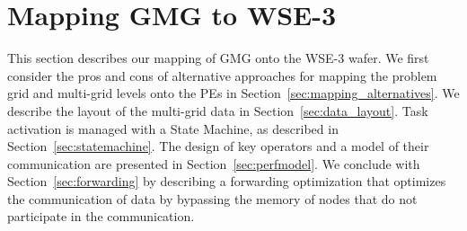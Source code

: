 \documentclass[conference]{IEEEtran}
\begin{document}

\section{Mapping GMG to WSE-3}
        This section describes our mapping of GMG onto the WSE-3 wafer.  We first consider the pros and cons of alternative approaches for mapping the problem grid and multi-grid levels onto the PEs in Section~\ref{sec:mapping_alternatives}.
        We describe the layout of the multi-grid data in Section~\ref{sec:data_layout}. %
        Task activation is managed with a State Machine, as described in Section~\ref{sec:statemachine}.  The design of key operators and a model of their communication are presented in Section~\ref{sec:perfmodel}.  We conclude with Section~\ref{sec:forwarding} by describing a forwarding optimization that optimizes the communication of data by bypassing the memory of nodes that do not participate in the communication.
\end{document}
